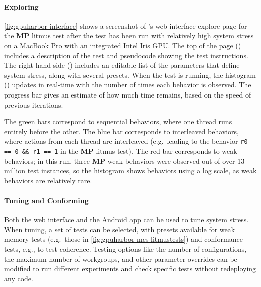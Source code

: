 \paragraph{Exploring\label{sec:gpuharbor-sys-overview-explore}}

\myfiglong\ref{fig:gpuharbor-interface} shows a screenshot of \gpuharbor's web interface explore page for the \textbf{MP} litmus test after the test has been run with relatively high system stress on a MacBook Pro with an integrated Intel Iris GPU. The top of the page () includes a description of the test and pseudocode showing the test instructions. The right-hand side () includes an editable list of the parameters that define system stress, along with several presets. When the test is running, the histogram () updates in real-time with the number of times each behavior is observed. The progress bar gives an estimate of how much time remains, based on the speed of previous iterations.

The green bars correspond to sequential behaviors, where one thread runs entirely before the other. The blue bar corresponds to interleaved behaviors, where actions from each thread are interleaved (e.g.\ leading to the behavior \texttt{r0 == 0 \&\& r1 == 1} in the \textbf{MP} litmus test). The red bar corresponds to weak behaviors; in this run, three \textbf{MP} weak behaviors were observed out of over 13 million test instances, so the histogram shows behaviors using a log scale, as weak behaviors are relatively rare.


\paragraph{Tuning and Conforming\label{sec:gpuharbor-sys-overview-tune-conform}}

Both the web interface and the Android app can be used to tune system stress. When tuning, a set of tests can be selected, with presets available for weak memory tests (e.g.\ those in \myfig\ref{fig:gpuharbor-mcs-litmustests}) and conformance tests, e.g., to test coherence. Testing options like the number of configurations, the maximum number of workgroups, and other parameter overrides can be modified to run different experiments and check specific tests without redeploying any code.

